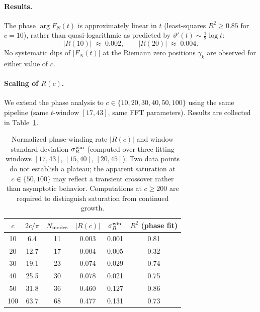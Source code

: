 \documentclass[12pt,a4paper]{amsart}
\theoremstyle{definition}
\begin{document}
\paragraph{Results.}
The phase $\arg F_N(t)$ is approximately linear in $t$
(least-squares $R^2 \geq 0.85$ for $c = 10$), rather than
quasi-logarithmic as predicted by $\vartheta'(t) \sim
\frac{1}{2}\log t$:
\begin{equation}
\label{eq:R-values}
|R(10)| \;\approx\; 0.002,
\qquad
|R(20)| \;\approx\; 0.004.
\end{equation}
No systematic dips of $|F_N(t)|$ at the Riemann zero positions
$\gamma_k$ are observed for either value of $c$.

\paragraph{Scaling of $R(c)$.}
We extend the phase analysis to $c \in \{10, 20, 30, 40, 50, 100\}$
using the same pipeline (same $t$-window $[17,43]$, same FFT
parameters). Results are collected in Table~\ref{tab:Rc}.

\begin{table}[h]
\centering
\renewcommand{\arraystretch}{1.3}
\begin{tabular}{cccccc}
\hline
$c$ & $2c/\pi$ & $N_{\rm modes}$ & $|R(c)|$ & $\sigma_R^{\rm win}$
& $R^2$ (phase fit) \\
\hline
10 & 6.4 & 11 & 0.003 & 0.001 & 0.81 \\
20 & 12.7 & 17 & 0.004 & 0.005 & 0.32 \\
30 & 19.1 & 23 & 0.074 & 0.029 & 0.74 \\
40 & 25.5 & 30 & 0.078 & 0.021 & 0.75 \\
50 & 31.8 & 36 & 0.460 & 0.127 & 0.86 \\
100 & 63.7 & 68 & 0.477 & 0.131 & 0.73 \\
\hline
\end{tabular}
\caption{Normalized phase-winding rate $|R(c)|$ and window standard
deviation $\sigma_R^{\rm win}$ (computed over three fitting windows
$[17,43]$, $[15,40]$, $[20,45]$). Two data points do not establish
a plateau; the apparent saturation at $c \in \{50, 100\}$ may
reflect a transient crossover rather than asymptotic behavior.
Computations at $c \geq 200$ are required to distinguish
saturation from continued growth.}
\label{tab:Rc}
\end{table}
\end{document}
